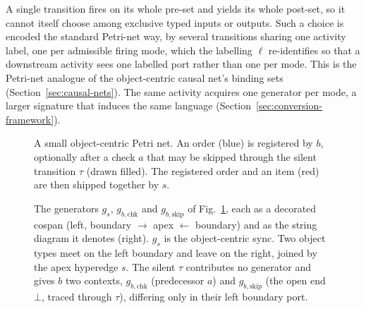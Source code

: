 \begin{remark}\label{rem:mode-refinement}
  A single transition fires on its whole pre-set and yields its whole post-set, so it cannot itself
  choose among exclusive typed inputs or outputs. Such a choice is encoded the standard Petri-net
  way, by several transitions sharing one activity label, one per admissible firing mode, which the
  labelling $\ell$ re-identifies so that a downstream activity sees one labelled port rather than one
  per mode. This is the Petri-net analogue of the object-centric causal net's binding sets
  (Section~\ref{sec:causal-nets}). The same activity acquires one generator per mode, a larger
  signature that induces the same language (Section~\ref{sec:conversion-framework}).
\end{remark}

\begin{figure}[tp]
  \centering
  \resizebox{\textwidth}{!}{\unskip}
  \caption{A small object-centric Petri net. An order (blue) is registered by $b$,
    optionally after a check $a$ that may be skipped through the silent transition
    $\tau$ (drawn filled). The registered order and an item (red) are then shipped
    together by $s$.}
  \label{fig:re-ocpn}
\end{figure}

\begin{figure}[tp]
  \centering
  \unskip
  \caption{The generators $g_s$, $g_{b,\mathrm{chk}}$ and $g_{b,\mathrm{skip}}$ of Fig.~\ref{fig:re-ocpn}, each as a decorated cospan
    (left, boundary $\to$ apex $\leftarrow$ boundary) and as the string diagram it denotes (right).
    $g_s$ is the object-centric sync. Two object types meet on the left boundary
    and leave on the right, joined by the apex hyperedge $s$. The silent $\tau$
    contributes no generator and gives $b$ two contexts, $g_{b,\mathrm{chk}}$
    (predecessor $a$) and $g_{b,\mathrm{skip}}$ (the open end $\bot$, traced
    through $\tau$), differing only in their left boundary port.}
  \label{fig:re-ocpn-cospans}
\end{figure}

